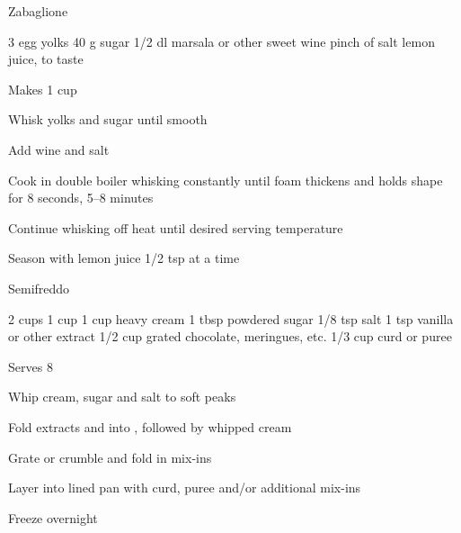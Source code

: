 \begin{recipe}{Zabaglione}{}
\begin{ingredients}
3 egg yolks
40 g sugar
1/2 dl marsala or other sweet wine
pinch of salt
lemon juice, to taste
\end{ingredients}
\nextcolumn
Makes 1 cup
\begin{steps}
    \item Whisk yolks and sugar until smooth
    \item Add wine and salt
    \item Cook in double boiler whisking constantly until foam thickens and holds shape for 8 seconds, 5--8 minutes
    \item Continue whisking off heat until desired serving temperature
    \item Season with lemon juice 1/2 tsp at a time
\end{steps}
\end{recipe}

\begin{recipe}{Semifreddo}{}
\begin{ingredients}
2 cups 
1 cup 
1 cup heavy cream
1 tbsp powdered sugar
1/8 tsp salt
1 tsp vanilla or other extract
1/2 cup grated chocolate, meringues, etc.
1/3 cup curd or puree
\end{ingredients}
\nextcolumn
Serves 8
\begin{steps}
    \item Whip cream, sugar and salt to soft peaks
    \item Fold extracts and  into , followed by whipped cream 
    \item Grate or crumble and fold in mix-ins
    \item Layer into lined pan with curd, puree and/or additional mix-ins
    \item Freeze overnight
\end{steps}
\end{recipe}

